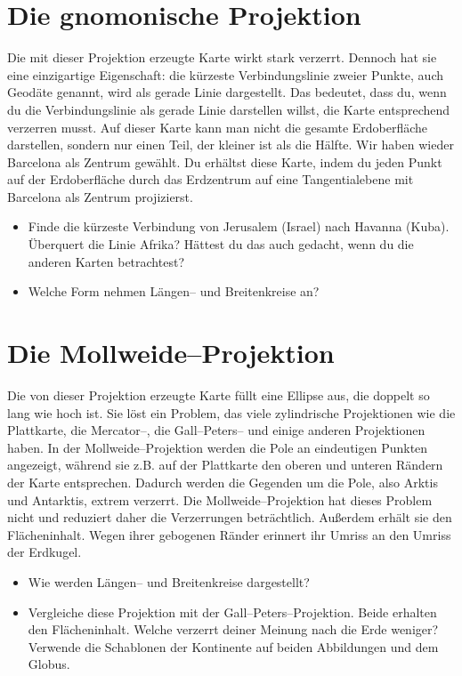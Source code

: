 \documentclass[a4paper,12pt]{article}
\begin{document}
\newpage
\section{Die gnomonische Projektion}
\label{sec-gnomic}

Die mit dieser Projektion erzeugte Karte wirkt stark verzerrt. Dennoch hat sie eine 
einzigartige Eigenschaft: die kürzeste Verbindungslinie zweier Punkte, auch Geodäte 
genannt, wird als gerade Linie dargestellt. Das bedeutet, dass du, wenn du die 
Verbindungslinie als gerade Linie darstellen willst, die Karte entsprechend verzerren 
musst. Auf dieser Karte kann man nicht die gesamte Erdoberfläche darstellen, sondern nur 
einen Teil, der kleiner ist als die Hälfte. Wir haben wieder Barcelona als Zentrum 
gewählt. Du erhältst diese Karte, indem du jeden Punkt auf der Erdoberfläche durch das 
Erdzentrum auf eine Tangentialebene mit Barcelona als Zentrum projizierst.

\begin{itemize}
 \item Finde die kürzeste Verbindung von Jerusalem (Israel) nach Havanna (Kuba). 
       Über\-quert die Linie Afrika? Hättest du das auch gedacht, wenn du die anderen 
       Karten betrachtest?
 \item Welche Form nehmen Längen-- und Breitenkreise an?
\end{itemize}





\newpage
\section{Die Mollweide--Projektion}
\label{sec-mollweide}

Die von dieser Projektion erzeugte Karte füllt eine Ellipse aus, die doppelt so 
lang wie hoch ist. Sie löst ein Problem, das viele zylindrische Projektionen wie 
die Plattkarte, die Mercator--, die Gall--Peters-- und einige anderen Projektionen 
haben. In der Mollweide--Projektion werden die Pole an eindeutigen Punkten angezeigt,
während sie z.B. auf der Plattkarte den oberen und unteren Rändern der Karte 
entsprechen. Dadurch werden die Gegenden um die Pole, also Arktis und Antarktis, 
extrem verzerrt. Die Mollweide--Projektion hat dieses Problem nicht und reduziert 
daher die Verzerrungen beträchtlich. Außerdem erhält sie den Flächeninhalt. Wegen 
ihrer gebogenen Ränder erinnert ihr Umriss an den Umriss der Erdkugel.

\begin{itemize}
 \item Wie werden Längen-- und Breitenkreise dargestellt?
 \item Vergleiche diese Projektion mit der Gall--Peters--Projektion. Beide erhalten 
       den Flächeninhalt. Welche verzerrt deiner Meinung nach die Erde weniger?
       Verwende die Schablonen der Kontinente auf beiden Abbildungen und dem Globus.
\end{itemize}
\end{document}
